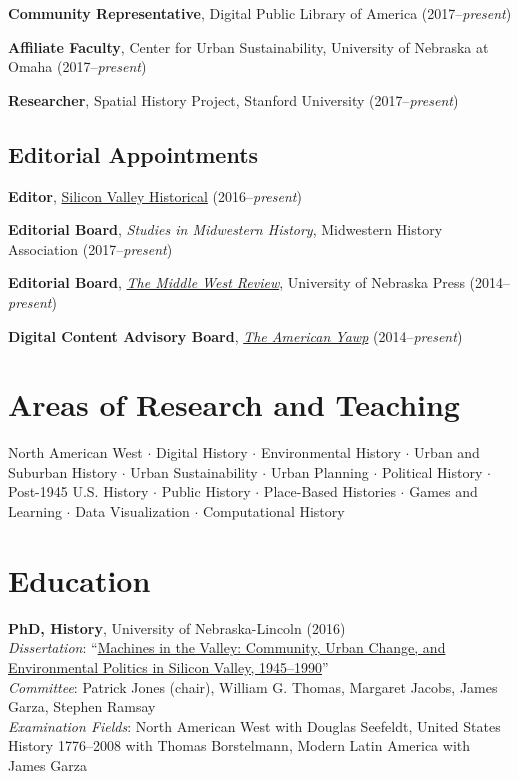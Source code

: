 \textbf{Community Representative}, Digital Public Library of America
(2017--\emph{present})

\textbf{Affiliate Faculty}, Center for Urban Sustainability, University
of Nebraska at Omaha (2017--\emph{present})

\textbf{Researcher}, Spatial History Project, Stanford University
(2017--\emph{present})

\vspace{0.2cm}

\subsection{Editorial Appointments}\label{editorial-appointments}

\textbf{Editor}, \href{http://svhistorical.org}{Silicon Valley
Historical} (2016--\emph{present})

\textbf{Editorial Board}, \emph{Studies in Midwestern History},
Midwestern History Association (2017--\emph{present})

\textbf{Editorial Board},
\emph{\href{https://uimiddle.wordpress.com/}{The Middle West Review}},
University of Nebraska Press (2014--\emph{present})

\textbf{Digital Content Advisory Board},
\emph{\href{http://www.americanyawp.com/}{The American Yawp}}
(2014--\emph{present})

\newpage

\section{Areas of Research and
Teaching}\label{areas-of-research-and-teaching}

North American West \(\cdot\) Digital History \(\cdot\) Environmental
History \(\cdot\) Urban and Suburban History \(\cdot\) Urban
Sustainability \(\cdot\) Urban Planning \(\cdot\) Political History
\(\cdot\) Post-1945 U.S. History \(\cdot\) Public History \(\cdot\)
Place-Based Histories \(\cdot\) Games and Learning \(\cdot\) Data
Visualization \(\cdot\) Computational History

\section{Education}\label{education}

\textbf{PhD, History}, University of Nebraska-Lincoln (2016)\\
\emph{Dissertation}:
``\href{http://digitalcommons.unl.edu/historydiss/86/}{Machines in the
Valley: Community, Urban Change, and Environmental Politics in Silicon
Valley, 1945--1990}''\\
\emph{Committee}: Patrick Jones (chair), William G. Thomas, Margaret
Jacobs, James Garza, Stephen Ramsay\\
\emph{Examination Fields}: North American West with Douglas Seefeldt,
United States History 1776--2008 with Thomas Borstelmann, Modern Latin
America with James Garza

